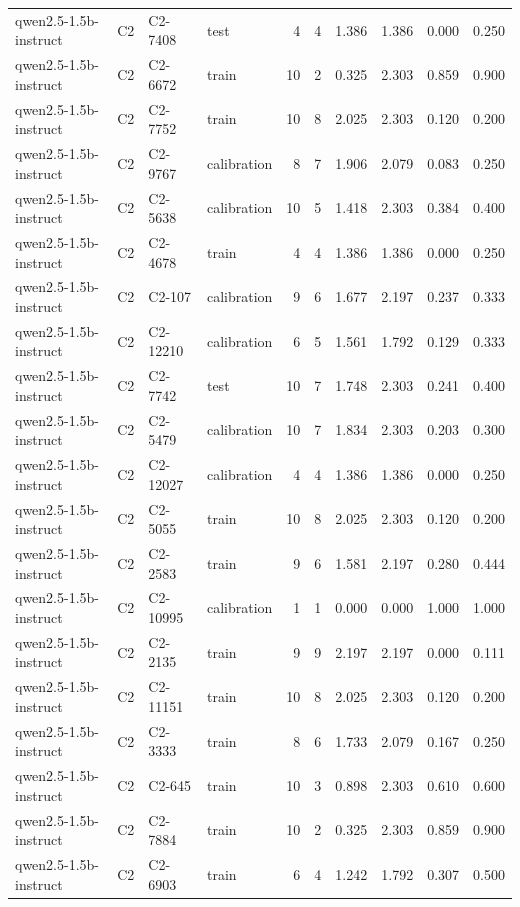 \begin{table}
\begin{tabular}{llllrrrrrr}
qwen2.5-1.5b-instruct & C2 & C2-7408 & test & 4 & 4 & 1.386 & 1.386 & 0.000 & 0.250 \\
qwen2.5-1.5b-instruct & C2 & C2-6672 & train & 10 & 2 & 0.325 & 2.303 & 0.859 & 0.900 \\
qwen2.5-1.5b-instruct & C2 & C2-7752 & train & 10 & 8 & 2.025 & 2.303 & 0.120 & 0.200 \\
qwen2.5-1.5b-instruct & C2 & C2-9767 & calibration & 8 & 7 & 1.906 & 2.079 & 0.083 & 0.250 \\
qwen2.5-1.5b-instruct & C2 & C2-5638 & calibration & 10 & 5 & 1.418 & 2.303 & 0.384 & 0.400 \\
qwen2.5-1.5b-instruct & C2 & C2-4678 & train & 4 & 4 & 1.386 & 1.386 & 0.000 & 0.250 \\
qwen2.5-1.5b-instruct & C2 & C2-107 & calibration & 9 & 6 & 1.677 & 2.197 & 0.237 & 0.333 \\
qwen2.5-1.5b-instruct & C2 & C2-12210 & calibration & 6 & 5 & 1.561 & 1.792 & 0.129 & 0.333 \\
qwen2.5-1.5b-instruct & C2 & C2-7742 & test & 10 & 7 & 1.748 & 2.303 & 0.241 & 0.400 \\
qwen2.5-1.5b-instruct & C2 & C2-5479 & calibration & 10 & 7 & 1.834 & 2.303 & 0.203 & 0.300 \\
qwen2.5-1.5b-instruct & C2 & C2-12027 & calibration & 4 & 4 & 1.386 & 1.386 & 0.000 & 0.250 \\
qwen2.5-1.5b-instruct & C2 & C2-5055 & train & 10 & 8 & 2.025 & 2.303 & 0.120 & 0.200 \\
qwen2.5-1.5b-instruct & C2 & C2-2583 & train & 9 & 6 & 1.581 & 2.197 & 0.280 & 0.444 \\
qwen2.5-1.5b-instruct & C2 & C2-10995 & calibration & 1 & 1 & 0.000 & 0.000 & 1.000 & 1.000 \\
qwen2.5-1.5b-instruct & C2 & C2-2135 & train & 9 & 9 & 2.197 & 2.197 & 0.000 & 0.111 \\
qwen2.5-1.5b-instruct & C2 & C2-11151 & train & 10 & 8 & 2.025 & 2.303 & 0.120 & 0.200 \\
qwen2.5-1.5b-instruct & C2 & C2-3333 & train & 8 & 6 & 1.733 & 2.079 & 0.167 & 0.250 \\
qwen2.5-1.5b-instruct & C2 & C2-645 & train & 10 & 3 & 0.898 & 2.303 & 0.610 & 0.600 \\
qwen2.5-1.5b-instruct & C2 & C2-7884 & train & 10 & 2 & 0.325 & 2.303 & 0.859 & 0.900 \\
qwen2.5-1.5b-instruct & C2 & C2-6903 & train & 6 & 4 & 1.242 & 1.792 & 0.307 & 0.500 \\

\end{tabular}
\end{table}
